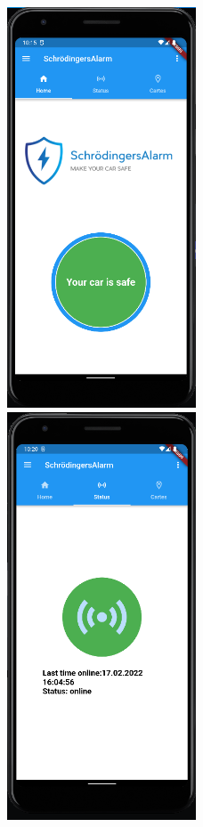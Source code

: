  	\begin{figure}[H]
   \centering
            \includegraphics[width=0.5\textwidth]{Bilder/home.PNG}
			\includegraphics[width=0.5\textwidth]{Bilder/status.PNG}

\end{figure}

